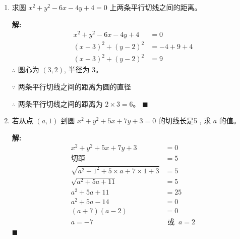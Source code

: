 \documentclass[10pt]{article}
\newcommand{\sol}{\textbf{解:} }
\begin{document}
\begin{enumerate}[leftmargin=*]
  \item 求圆 $x^{2}+y^{2}-6 x-4 y+4=0$ 上两条平行切线之间的距离。

        \sol{}
        \begin{align*}
          x^2 + y^2 - 6x - 4y + 4 & = 0          \\
          (x-3)^2 + (y-2)^2       & = -4 + 9 + 4 \\
          (x-3)^2 + (y-2)^2       & = 9
        \end{align*}
        $\therefore$ 圆心为 $(3, 2)$, 半径为 $3$。

        $\because$ 两条平行切线之间的距离为圆的直径

        $\therefore$ 两条平行切线之间的距离为 $2 \times 3 = 6$。 \hfill$\blacksquare$

  \item 若从点 $(a, 1)$ 到圆 $x^{2}+y^{2}+5 x+7 y+3=0$ 的切线长是5 , 求 $a$ 的值。

        \sol{}
        \begin{align*}
          x^{2}+y^{2}+5 x+7 y+3                              & = 0               \\
          \text{切距}                                          & = 5               \\
          \sqrt{a^{2} + 1^{2} + 5 \times a + 7 \times 1 + 3} & = 5               \\
          \sqrt{a^{2} + 5a + 11}                             & = 5               \\
          a^{2} + 5a + 11                                    & = 25              \\
          a^{2} + 5a - 14                                    & = 0               \\
          (a + 7)(a - 2)                                     & = 0               \\
          a = -7                                             & \text{ 或 }\ a = 2
        \end{align*} \hfill$\blacksquare$
\end{enumerate}
\end{document}
